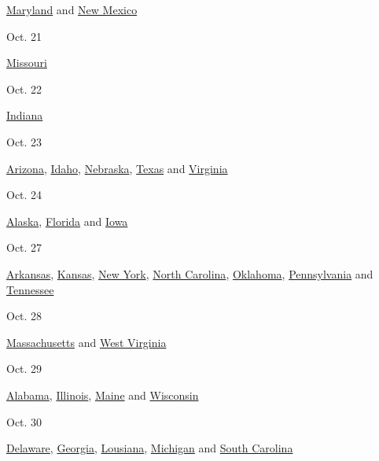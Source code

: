 \href{https://elections.maryland.gov/voting/index.html}{Maryland} and
\href{https://www.sos.state.nm.us/voting-and-elections/voter-information-portal/absentee-and-early-voting/}{New
Mexico}

Oct. 21

\href{https://www.sos.mo.gov/elections}{Missouri}

Oct. 22

\href{https://www.in.gov/sos/elections/}{Indiana}

Oct. 23

\href{https://azsos.gov/votebymail}{Arizona},
\href{https://sos.idaho.gov/elections-division/}{Idaho},
\href{https://www.nebraska.gov/featured/elections-voting/}{Nebraska},
\href{https://www.sos.state.tx.us/elections/index.shtml}{Texas} and
\href{https://www.elections.virginia.gov/}{Virginia}

Oct. 24

\href{https://www.elections.alaska.gov/Core/votingbymail.php}{Alaska},
\href{https://dos.myflorida.com/elections/}{Florida} and
\href{https://sos.iowa.gov/elections/voterinformation/index.html}{Iowa}

Oct. 27

\href{https://www.sos.arkansas.gov/elections}{Arkansas},
\href{https://sos.ks.gov/elections/elections.html}{Kansas},
\href{https://www.elections.ny.gov/}{New York},
\href{https://www.ncsbe.gov/voting/vote-mail}{North Carolina},
\href{https://www.ok.gov/elections/}{Oklahoma},
\href{https://www.dos.pa.gov/VotingElections/Pages/default.aspx}{Pennsylvania}
and
\href{https://sos.tn.gov/products/elections/2020-election-calendar}{Tennessee}

Oct. 28

\href{https://www.sec.state.ma.us/ele/eleidx.htm}{Massachusetts} and
\href{https://sos.wv.gov/elections/Pages/default.aspx}{West Virginia}

Oct. 29

\href{https://www.sos.alabama.gov/alabama-votes/voter/absentee-voting}{Alabama},
\href{https://www.elections.il.gov/}{Illinois},
\href{https://www.maine.gov/sos/cec/elec/}{Maine} and
\href{https://elections.wi.gov/}{Wisconsin}

Oct. 30

\href{https://elections.delaware.gov/index.shtml}{Delaware},
\href{https://sos.ga.gov/index.php/?section=elections}{Georgia},
\href{https://www.sos.la.gov/electionsandvoting/Pages/default.aspx}{Lousiana},
\href{https://www.michigan.gov/sos/0,4670,7-127-1633---,00.html}{Michigan}
and \href{https://www.scvotes.org/}{South Carolina}


